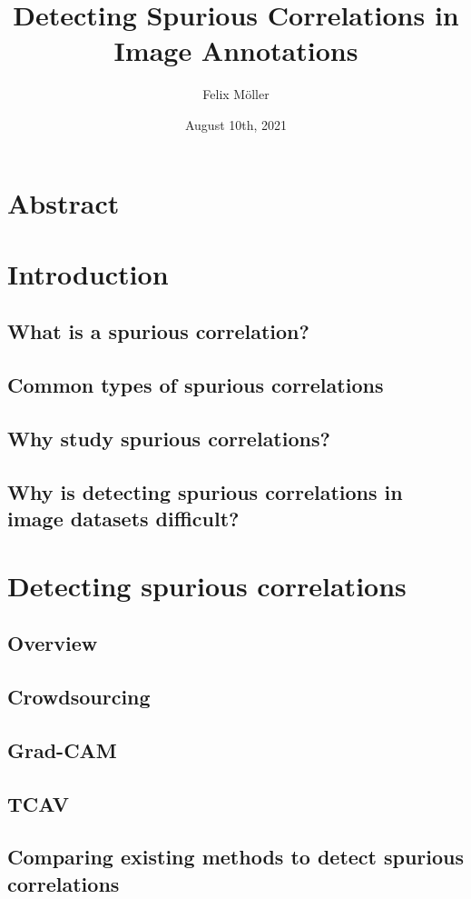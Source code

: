\documentclass{article}
\title{Detecting Spurious Correlations in Image Annotations}
\author{Felix Möller}
\date{August 10th, 2021}
\begin{document}
\maketitle
\tableofcontents
\section{Abstract}

\section{Introduction}
\subsection{What is a spurious correlation?}
\subsection{Common types of spurious correlations}
\subsection{Why study spurious correlations?}
\subsection{Why is detecting spurious correlations in image datasets difficult?}

\section{Detecting spurious correlations}
\subsection{Overview}
\subsection{Crowdsourcing}
\subsection{Grad-CAM}
\subsection{TCAV}
\subsection{Comparing existing methods to detect spurious correlations}
\end{document}
